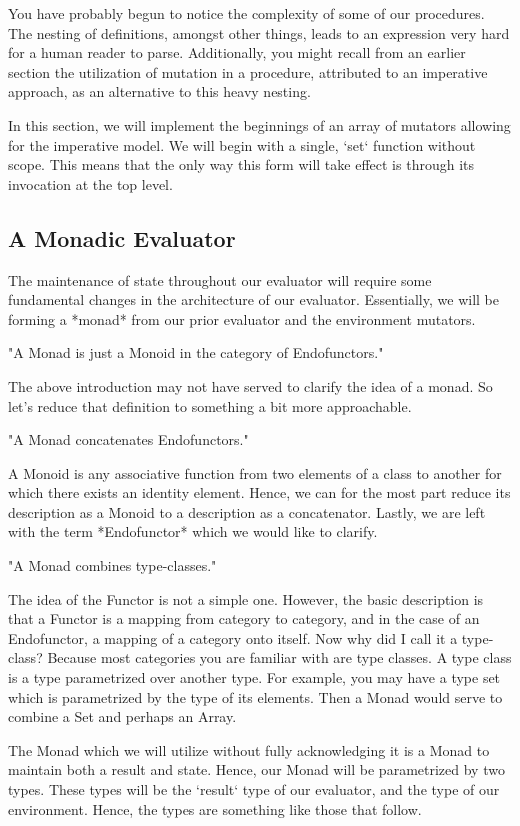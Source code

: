 You have probably begun to notice the complexity of some of our procedures.
The nesting of definitions, amongst other things, leads to an expression very
hard for a human reader to parse. Additionally, you might recall from an
earlier section the utilization of mutation in a procedure, attributed to an
imperative approach, as an alternative to this heavy nesting.

In this section, we will implement the beginnings of an array of mutators
allowing for the imperative model. We will begin with a single, `set` 
function without scope. This means that the only way this form will take
effect is through its invocation at the top level.

\subsection{A Monadic Evaluator}
The maintenance of state throughout our evaluator will require some 
fundamental changes in the architecture of our evaluator. Essentially, we 
will be forming a *monad* from our prior evaluator and the environment 
mutators.

"A Monad is just a Monoid in the category of Endofunctors."

The above introduction may not have served to clarify the idea of a monad. So
let's reduce that definition to something a bit more approachable.

"A Monad concatenates Endofunctors."

A Monoid is any associative function from two elements of a class to another
for which there exists an identity element. Hence, we can for the most part
reduce its description as a Monoid to a description as a concatenator. 
Lastly, we are left with the term *Endofunctor* which we would like to 
clarify.

"A Monad combines type-classes."

The idea of the Functor is not a simple one. However, the basic description
is that a Functor is a mapping from category to category, and in the case of
an Endofunctor, a mapping of a category onto itself. Now why did I call it a
type-class? Because most categories you are familiar with are type classes.
A type class is a type parametrized over another type. For example, you may
have a type set which is parametrized by the type of its elements. Then a
Monad would serve to combine a Set and perhaps an Array.

The Monad which we will utilize without fully acknowledging it is a Monad
to maintain both a result and state. Hence, our Monad will be parametrized
by two types. These types will be the `result` type of our evaluator, and the
type of our environment. Hence, the types are something like those that
follow.

